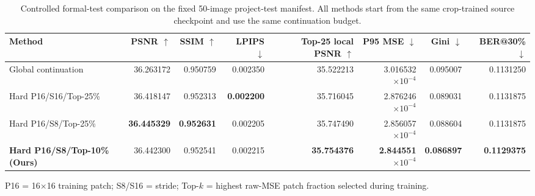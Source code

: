 \begin{table}[t]
  \centering
  \caption{Controlled formal-test comparison on the fixed 50-image project-test manifest. All methods start from the same crop-trained source checkpoint and use the same continuation budget.}
  \label{tab:main_results}
  \scriptsize
  \setlength{\tabcolsep}{3.0pt}
  \renewcommand{\arraystretch}{1.10}
  \begin{tabular*}{\textwidth}{@{\extracolsep{\fill}}lrrrrrrr@{}}
    \toprule
    Method & PSNR $\uparrow$ & SSIM $\uparrow$ & LPIPS $\downarrow$ & Top-25 local PSNR $\uparrow$ & P95 MSE $\downarrow$ & Gini $\downarrow$ & BER@30\% $\downarrow$ \\
    \midrule
    Global continuation & 36.263172 & 0.950759 & 0.002350 & 35.522213 & 3.016532$\times10^{-4}$ & 0.095007 & 0.1131250 \\
    Hard P16/S16/Top-25\% & 36.418147 & 0.952313 & \textbf{0.002200} & 35.716045 & 2.876246$\times10^{-4}$ & 0.089031 & 0.1131875 \\
    Hard P16/S8/Top-25\% & \textbf{36.445329} & \textbf{0.952631} & 0.002205 & 35.747490 & 2.856057$\times10^{-4}$ & 0.088604 & 0.1131875 \\
    \textbf{Hard P16/S8/Top-10\% (Ours)} & 36.442300 & 0.952541 & 0.002215 & \textbf{35.754376} & \textbf{2.844551$\times10^{-4}$} & \textbf{0.086897} & \textbf{0.1129375} \\
    \bottomrule
  \end{tabular*}
  \vspace{2pt}
  \parbox{\textwidth}{\scriptsize P16 = 16$\times$16 training patch; S8/S16 = stride; Top-$k$ = highest raw-MSE patch fraction selected during training.}
\end{table}

